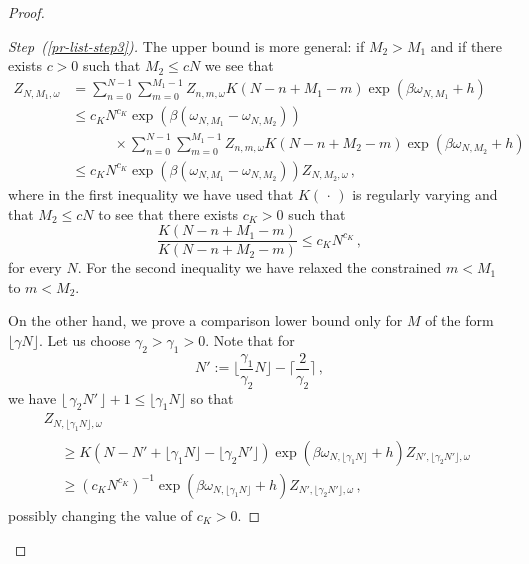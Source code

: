 \documentclass[10pt]{amsart}
\theoremstyle{definition}\newtheorem{defi}[theo]{Definition}\newtheorem{rema}[theo]{Remark}\newtheorem{exam}[theo]{Example}\newtheorem{exem}[theo]{Example}\newtheorem{nota}[theo]{Notation}
\newenvironment{step}[1]{\begin{proof}[{#1}]}{\let\qed\relax\end{proof}}
\newcommand{\gb}{\beta}
\newcommand{\go}{\omega}
\begin{document}
\begin{proof}
\begin{step}{Step~(\ref{pr-list-step3})}
The upper bound is more general: if $M_2> M_1$ and if there exists $c>0$ such that $M_2 \le c N$ we see that
\begin{equation}\label{eq:comparison-upper}
\begin{split}
Z_{N, M_1, \go} & = \sum_{n=0}^{N-1} \sum_{m=0}^{M_1-1} Z_{n, m, \go} K(N-n+M_1-m) \exp\left(\gb \go_{N, M_1} +h\right)
\\
&\le c_K N^{c_K} \exp\left(\gb (\go_{N, M_1}-\go_{N, M_2}) \right)
\\ & \quad \qquad \times
\sum_{n=0}^{N-1} \sum_{m=0}^{M_1-1} Z_{n, m, \go} K(N-n+M_2-m) \exp\left(\gb \go_{N, M_2} +h\right)
\\ &\le c_K N^{c_K} \exp\left(\gb (\go_{N, M_1}-\go_{N, M_2}) \right) Z_{N, M_2, \go}\,,
\end{split}
\end{equation}
where in the first inequality we have used that $K({\,\cdot\,})$ is regularly varying and that $M_2 \le cN$ to see that there exists $c_K>0$ such that
\begin{equation}
\frac{K(N-n+M_1-m)}{K(N-n+M_2-m)} \le c_K N^{c_K}\,,
\end{equation}
for every $N$. For the second inequality we have relaxed the constrained $m< M_1$ to $m<M_2$.

On the other hand, we prove a comparison lower bound only for $M$ of the form $\lfloor \gamma N \rfloor$. Let us choose $\gamma_2>\gamma_1>0$. Note that for
\begin{equation}
N' := \Big \lfloor \frac{\gamma_1}{\gamma_2}N \Big \rfloor - \Big \lceil \frac{2}{\gamma_2} \Big \rceil\,,
\end{equation}
we have $\lfloor\,\gamma_2 N'\,\rfloor +1 \le \lfloor \gamma_1 N \rfloor $ so that
\begin{multline}\label{eq:comparison-lower}
Z_{N, \lfloor \gamma_1 N \rfloor, \go}\\
\begin{aligned}
&\ge K\left(N-N'+ \lfloor \gamma_1 N \rfloor -\lfloor \gamma_2 N' \rfloor\right)
\exp\left(\gb\go_{N, \lfloor \gamma_1 N \rfloor }+h\right) Z_{N', \lfloor \gamma_2 N' \rfloor, \go}
\\
&\ge \left(c_K N^{c_K}\right)^{-1} \exp\left(\gb\go_{N, \lfloor \gamma_1 N \rfloor }+h\right) Z_{N', \lfloor \gamma_2 N' \rfloor, \go}\,,
\end{aligned}
\end{multline}
possibly changing the value of $c_K>0$.


\end{step}
\end{proof}
\end{document}
